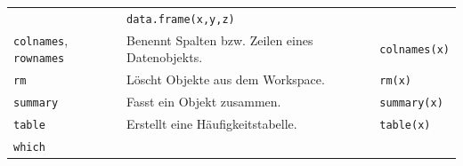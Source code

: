 \documentclass[]{book}
\begin{document}
\begin{longtable}[]{@{}lll@{}}
\begin{minipage}[t]{0.28\columnwidth}
\end{minipage} & \begin{minipage}[t]{0.33\columnwidth}\raggedright
\texttt{data.frame(x,y,z)}\strut
\end{minipage}\tabularnewline
\begin{minipage}[t]{0.30\columnwidth}\raggedright
\texttt{colnames}, \texttt{rownames}\strut
\end{minipage} & \begin{minipage}[t]{0.28\columnwidth}\raggedright
Benennt Spalten bzw. Zeilen eines Datenobjekts.\strut
\end{minipage} & \begin{minipage}[t]{0.33\columnwidth}\raggedright
\texttt{colnames(x)}\strut
\end{minipage}\tabularnewline
\begin{minipage}[t]{0.30\columnwidth}\raggedright
\texttt{rm}\strut
\end{minipage} & \begin{minipage}[t]{0.28\columnwidth}\raggedright
Löscht Objekte aus dem Workspace.\strut
\end{minipage} & \begin{minipage}[t]{0.33\columnwidth}\raggedright
\texttt{rm(x)}\strut
\end{minipage}\tabularnewline
\begin{minipage}[t]{0.30\columnwidth}\raggedright
\texttt{summary}\strut
\end{minipage} & \begin{minipage}[t]{0.28\columnwidth}\raggedright
Fasst ein Objekt zusammen.\strut
\end{minipage} & \begin{minipage}[t]{0.33\columnwidth}\raggedright
\texttt{summary(x)}\strut
\end{minipage}\tabularnewline
\begin{minipage}[t]{0.30\columnwidth}\raggedright
\texttt{table}\strut
\end{minipage} & \begin{minipage}[t]{0.28\columnwidth}\raggedright
Erstellt eine Häufigkeitstabelle.\strut
\end{minipage} & \begin{minipage}[t]{0.33\columnwidth}\raggedright
\texttt{table(x)}\strut
\end{minipage}\tabularnewline
\begin{minipage}[t]{0.30\columnwidth}\raggedright
\texttt{which}\strut
\end{minipage} & \begin{minipage}[t]{0.28\columnwidth}\raggedright

\end{minipage}
\end{longtable}
\end{document}
